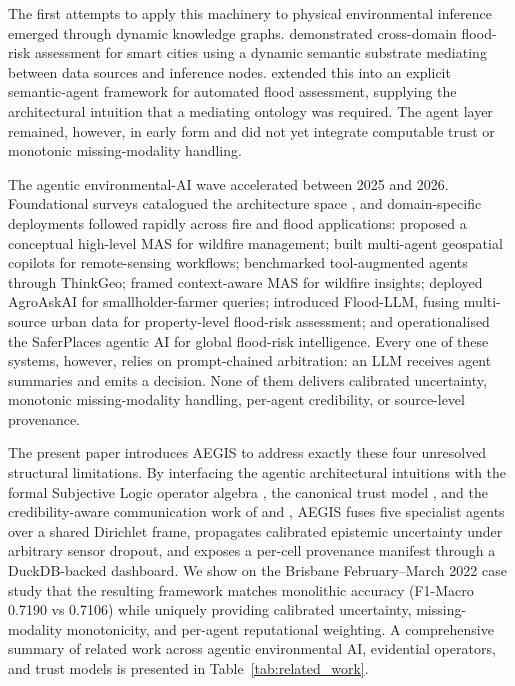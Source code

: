 The first attempts to apply this machinery to physical environmental inference emerged through dynamic knowledge graphs. \citet{hofmeister2023cross} demonstrated cross-domain flood-risk assessment for smart cities using a dynamic semantic substrate mediating between data sources and inference nodes. \citet{hofmeister2024semantic} extended this into an explicit semantic-agent framework for automated flood assessment, supplying the architectural intuition that a mediating ontology was required. The agent layer remained, however, in early form and did not yet integrate computable trust or monotonic missing-modality handling.

The agentic environmental-AI wave accelerated between 2025 and 2026. Foundational surveys catalogued the architecture space \citep{sayyad2025agentic, talemi2026agentic}, and domain-specific deployments followed rapidly across fire and flood applications: \citet{bairamzadeh2025conceptual} proposed a conceptual high-level MAS for wildfire management; \citet{lee2025multiagent} built multi-agent geospatial copilots for remote-sensing workflows; \citet{shabbir2025thinkgeo} benchmarked tool-augmented agents through ThinkGeo; \citet{sandeep2026contextaware} framed context-aware MAS for wildfire insights; \citet{palancacantonjos2026agroaskai} deployed AgroAskAI for smallholder-farmer queries; \citet{jiang2026floodllm} introduced Flood-LLM, fusing multi-source urban data for property-level flood-risk assessment; and \citet{redaelli2026saferplaces} operationalised the SaferPlaces agentic AI for global flood-risk intelligence. Every one of these systems, however, relies on prompt-chained arbitration: an LLM receives agent summaries and emits a decision. None of them delivers calibrated uncertainty, monotonic missing-modality handling, per-agent credibility, or source-level provenance.

The present paper introduces AEGIS to address exactly these four unresolved structural limitations. By interfacing the agentic architectural intuitions \citep{hofmeister2024semantic, talemi2026agentic} with the formal Subjective Logic operator algebra \citep{kaplan2015partial, vanderheijden2018multisource}, the canonical trust model \citep{wang2007formal}, and the credibility-aware communication work of \citet{sun2024t2mac} and \citet{chikoti2025conflict}, AEGIS fuses five specialist agents over a shared Dirichlet frame, propagates calibrated epistemic uncertainty under arbitrary sensor dropout, and exposes a per-cell provenance manifest through a DuckDB-backed dashboard. We show on the Brisbane February--March 2022 case study that the resulting framework matches monolithic accuracy (F1-Macro 0.7190 vs 0.7106) while uniquely providing calibrated uncertainty, missing-modality monotonicity, and per-agent reputational weighting. A comprehensive summary of related work across agentic environmental AI, evidential operators, and trust models is presented in Table~\ref{tab:related_work}.

